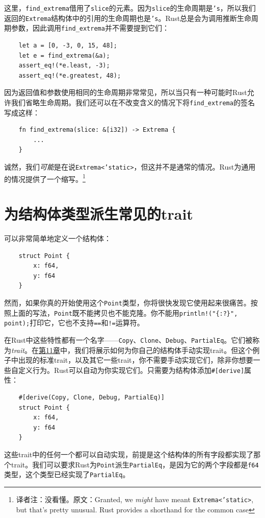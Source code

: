 这里，\texttt{find\_extrema}借用了\texttt{slice}的元素。因为\texttt{slice}的生命周期是\texttt{'s}，所以我们返回的\texttt{Extrema}结构体中的引用的生命周期也是\texttt{'s}。Rust总是会为调用推断生命周期参数，因此调用\texttt{find\_extrema}并不需要提到它们：
\begin{verbatim}
    let a = [0, -3, 0, 15, 48];
    let e = find_extrema(&a);
    assert_eq!(*e.least, -3);
    assert_eq!(*e.greatest, 48);
\end{verbatim}

因为返回值和参数使用相同的生命周期非常常见，所以当只有一种可能时Rust允许我们省略生命周期。我们还可以在不改变含义的情况下将\texttt{find\_extrema}的签名写成这样：
\begin{verbatim}
    fn find_extrema(slice: &[i32]) -> Extrema {
        ...
    }
\end{verbatim}

诚然，我们\emph{可能}是在说\texttt{Extrema<'static>}，但这并不是通常的情况。Rust为通用的情况提供了一个缩写。\footnote{译者注：没看懂。原文：Granted, we \emph{might} have meant \texttt{Extrema<'static>}, but that’s pretty unusual. Rust provides a shorthand for the common case}

\section{为结构体类型派生常见的trait}

可以非常简单地定义一个结构体：
\begin{verbatim}
    struct Point {
        x: f64,
        y: f64
    }
\end{verbatim}

然而，如果你真的开始使用这个\texttt{Point}类型，你将很快发现它使用起来很痛苦。按照上面的写法，\texttt{Point}既不能拷贝也不能克隆。你不能用\texttt{println!("\{:?\}", point);}打印它，它也不支持\texttt{==}和\texttt{!=}运算符。

在Rust中这些特性都有一个名字——\texttt{Copy}、\texttt{Clone}、\texttt{Debug}、\texttt{PartialEq}。它们被称为\emph{trait}。在\hyperref[ch11]{第11章}中，我们将展示如何为你自己的结构体手动实现trait。但这个例子中出现的标准trait，以及其它一些trait，你不需要手动实现它们，除非你想要一些自定义行为。Rust可以自动为你实现它们。只需要为结构体添加\texttt{\#[derive]}属性：
\begin{verbatim}
    #[derive(Copy, Clone, Debug, PartialEq)]
    struct Point {
        x: f64,
        y: f64
    }
\end{verbatim}

这些trait中的任何一个都可以自动实现，前提是这个结构体的所有字段都实现了那个trait。我们可以要求Rust为\texttt{Point}派生\texttt{PartialEq}，是因为它的两个字段都是\texttt{f64}类型，这个类型已经实现了\texttt{PartialEq}。

